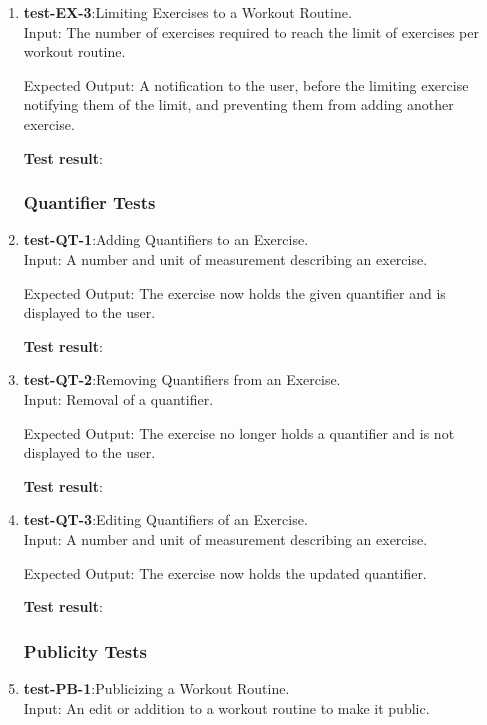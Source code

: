 \documentclass[12pt, titlepage]{article}
\begin{document}
\begin{enumerate}
	\item{\textbf{test-EX-3}}:Limiting Exercises to a Workout Routine.\\
	
	Input: The number of exercises required to reach the limit of exercises per workout routine. 
	
	Expected Output: A notification to the user, before the limiting exercise notifying them of the limit, and preventing them from adding another exercise.
	
	\textbf{Test result}:
	
\subsubsection{Quantifier Tests}
	\item{\textbf{test-QT-1}}:Adding Quantifiers to an Exercise.\\
	
	Input: A number and unit of measurement describing an exercise.
	
	Expected Output: The exercise now holds the given quantifier and is displayed to the user.
	
	\textbf{Test result}:
	
	\item{\textbf{test-QT-2}}:Removing Quantifiers from an Exercise.\\
	
	Input: Removal of a quantifier.
	
	Expected Output: The exercise no longer holds a quantifier and is not displayed to the user.
	
	\textbf{Test result}:
	
	\item{\textbf{test-QT-3}}:Editing Quantifiers of an Exercise.\\
	
	Input: A number and unit of measurement describing an exercise.
	
	Expected Output: The exercise now holds the updated quantifier.
	
	\textbf{Test result}:
	
\subsubsection{Publicity Tests}
	\item{\textbf{test-PB-1}}:Publicizing a Workout Routine.\\
	
	Input: An edit or addition to a workout routine to make it public.
	

\end{enumerate}
\end{document}
